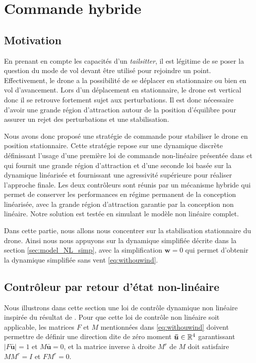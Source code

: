 
\chapter{Commande hybride}
\label{chap:hybrid}
\minitoc


\section{Motivation}
En prenant en compte les capacités d'un \textit{tailsitter}, il est légitime de se poser la question du mode de vol devant être utilisé pour rejoindre un point. Effectivement, le drone a la possibilité de se déplacer en stationnaire ou bien en vol d'avancement. Lors d'un déplacement en stationnaire, le drone est vertical donc il se retrouve fortement sujet aux perturbations. Il est donc nécessaire d'avoir une grande région d'attraction autour de la position d'équilibre pour assurer un rejet des perturbations et une stabilisation.

Nous avons donc proposé une stratégie de commande pour stabiliser le drone en position stationnaire. Cette stratégie repose sur une dynamique discrète définissant l'usage d'une première loi de commande non-linéaire présentée dans \cite{2020e-MicCenZacFra} et qui fournit une grande région d'attraction et d'une seconde loi basée sur la dynamique linéarisée et fournissant une agressivité supérieure pour réaliser l'approche finale. Les deux contrôleurs sont réunis par un mécanisme hybride qui permet de conserver les performances en régime permanent de la conception linéarisée, avec la grande région d'attraction garantie par la conception non linéaire. Notre solution est testée en simulant le modèle non linéaire complet.

Dans cette partie, nous allons nous concentrer sur la stabilisation stationnaire du drone. Ainsi nous nous appuyons sur la dynamique simplifiée décrite dans la section \ref{sec:model_NL_simp}, avec la simplification $\boldsymbol{w} = 0$ qui permet d'obtenir la dynamique simplifiée sans vent \eqref{eq:withouwind}. 



\section{Contrôleur par retour d'état non-linéaire}
Nous illustrons dans cette section une loi de contrôle dynamique non linéaire inspirée du résultat de \cite{2020e-MicCenZacFra}. Pour que cette loi de contrôle non linéaire soit applicable, les matrices $F$ et $M$ mentionnées dans \eqref{eq:withouwind} doivent permettre de définir une direction dite de zéro moment $\boldsymbol{\bar u} \in {\mathbb R}^4$ garantissant
$|F\boldsymbol{\bar u}| = 1$ et $M \boldsymbol{\bar u}=0$, et la matrice inverse à droite $M^r$ de $M$ doit satisfaire $M M^r = I$ et $FM^r=0$. 

